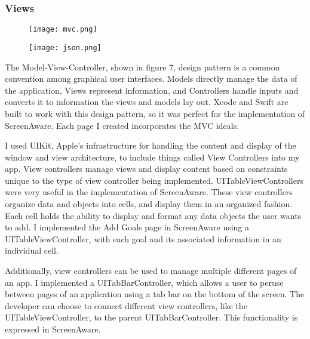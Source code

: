 \documentclass[12pt, title page, manuscript, nonacm]{acmart}
\begin{document}
\subsubsection*{Views}
\begin{figure}[h]
  \texttt{[image: mvc.png]}
  \caption{}
\endminipage
\hspace{2cm}
    \texttt{[image: json.png]}
    \caption{}
\endminipage
\end{figure}
The Model-View-Controller, shown in figure 7, design pattern is a common convention among graphical user interfaces. Models directly manage the data of the application, Views represent information, and Controllers handle inputs and converts it to information the views and models lay out. Xcode and Swift are built to work with this design pattern, so it was perfect for the implementation of ScreenAware. Each page I created incorporates the MVC ideals. 
\par I used UIKit, Apple's infrastructure for handling the content and display of the window and view architecture, to include things called View Controllers into my app. View controllers manage views and display content based on constraints unique to the type of view controller being implemented. UITableViewControllers were very useful in the implementation of ScreenAware. These view controllers organize data and objects into cells, and display them in an organized fashion. Each cell holds the ability to display and format any data objects the user wants to add. I implemented the Add Goals page in ScreenAware using a UITableViewController, with each goal and its associated information in an individual cell. 
\par
Additionally, view controllers can be used to manage multiple different pages of an app. I implemented a UITabBarController, which allows a user to peruse between pages of an application using a tab bar on the bottom of the screen. The developer can choose to connect different view controllers, like the UITableViewController, to the parent UITabBarController. This functionality is expressed in ScreenAware.
\end{document}

